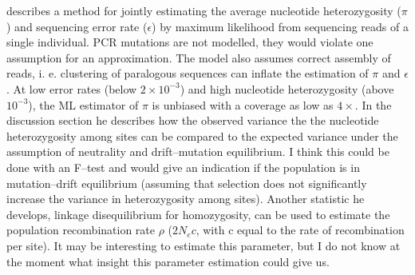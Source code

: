 \documentclass{article}\usepackage[]{graphicx}\usepackage[]{color}
\begin{document}
\cite{Lynch2008} describes a method for jointly estimating the average nucleotide heterozygosity ($\pi$) and sequencing error rate ($\epsilon$) by maximum likelihood from sequencing reads of a single individual. PCR mutations are not modelled, they would violate one assumption for an approximation. The model also assumes correct assembly of reads, i. e. clustering of paralogous sequences can inflate the estimation of $\pi$ and $\epsilon$. At low error rates (below $2\times10^{-3}$) and high nucleotide heterozygosity (above $10^{-3}$), the ML estimator of $\pi$ is unbiased with a coverage as low as $4\times$. In the discussion section he describes how the observed variance the the nucleotide heterozygosity among sites can be compared to the expected variance under the assumption of neutrality and drift--mutation equilibrium. I think this could be done with an F--test and would give an indication if the population is in mutation--drift equilibrium (assuming that selection does not significantly increase the variance in heterozygosity among sites). Another statistic he develops, linkage disequilibrium for homozygosity, can be used to estimate the population recombination rate $\rho$ ($2N_{e}c$, with c equal to the rate of recombination per site). It may be interesting to estimate this parameter, but I do not know at the moment what insight this parameter estimation could give us. 
\end{document}
